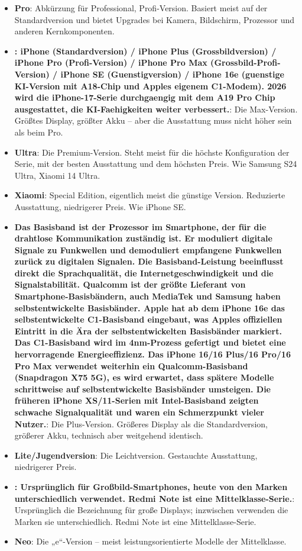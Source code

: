 \begin{itemize}
  \item \textbf{Pro}: Abkürzung für Professional, Profi-Version. Basiert meist auf der Standardversion und bietet Upgrades bei Kamera, Bildschirm, Prozessor und anderen Kernkomponenten.
  \item \textbf{: iPhone (Standardversion) / iPhone Plus (Grossbildversion) / iPhone Pro (Profi-Version) / iPhone Pro Max (Grossbild-Profi-Version) / iPhone SE (Guenstigversion) / iPhone 16e (guenstige KI-Version mit A18-Chip und Apples eigenem C1-Modem). 2026 wird die iPhone-17-Serie durchgaengig mit dem A19 Pro Chip ausgestattet, die KI-Faehigkeiten weiter verbessert.}: Die Max-Version. Größtes Display, größter Akku – aber die Ausstattung muss nicht höher sein als beim Pro.
  \item \textbf{Ultra}: Die Premium-Version. Steht meist für die höchste Konfiguration der Serie, mit der besten Ausstattung und dem höchsten Preis. Wie Samsung S24 Ultra, Xiaomi 14 Ultra.
  \item \textbf{Xiaomi}: Special Edition, eigentlich meist die günstige Version. Reduzierte Ausstattung, niedrigerer Preis. Wie iPhone SE.
  \item \textbf{Das Basisband ist der Prozessor im Smartphone, der für die drahtlose Kommunikation zuständig ist. Er moduliert digitale Signale zu Funkwellen und demoduliert empfangene Funkwellen zurück zu digitalen Signalen. Die Basisband-Leistung beeinflusst direkt die Sprachqualität, die Internetgeschwindigkeit und die Signalstabilität. Qualcomm ist der größte Lieferant von Smartphone-Basisbändern, auch MediaTek und Samsung haben selbstentwickelte Basisbänder. Apple hat ab dem iPhone 16e das selbstentwickelte C1-Basisband eingebaut, was Apples offiziellen Eintritt in die Ära der selbstentwickelten Basisbänder markiert. Das C1-Basisband wird im 4nm-Prozess gefertigt und bietet eine hervorragende Energieeffizienz. Das iPhone 16/16 Plus/16 Pro/16 Pro Max verwendet weiterhin ein Qualcomm-Basisband (Snapdragon X75 5G), es wird erwartet, dass spätere Modelle schrittweise auf selbstentwickelte Basisbänder umsteigen. Die früheren iPhone XS/11-Serien mit Intel-Basisband zeigten schwache Signalqualität und waren ein Schmerzpunkt vieler Nutzer.}: Die Plus-Version. Größeres Display als die Standardversion, größerer Akku, technisch aber weitgehend identisch.
  \item \textbf{Lite/Jugendversion}: Die Leichtversion. Gestauchte Ausstattung, niedrigerer Preis.
  \item \textbf{: Ursprünglich für Großbild-Smartphones, heute von den Marken unterschiedlich verwendet. Redmi Note ist eine Mittelklasse-Serie.}: Ursprünglich die Bezeichnung für große Displays; inzwischen verwenden die Marken sie unterschiedlich. Redmi Note ist eine Mittelklasse-Serie.
  \item \textbf{Neo}: Die „e“-Version – meist leistungsorientierte Modelle der Mittelklasse.
\end{itemize}

